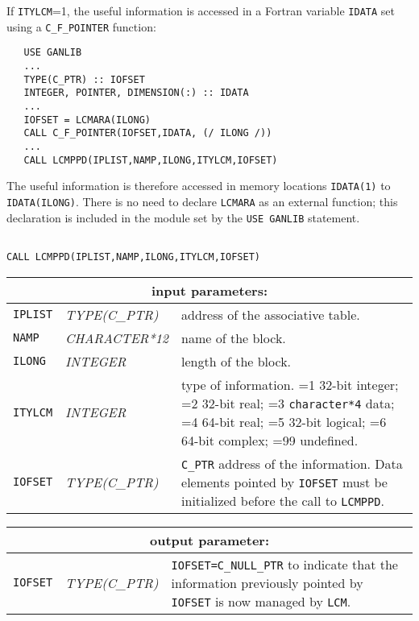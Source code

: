 \vskip 0.2cm

If {\tt ITYLCM}=1, the useful information is accessed in a Fortran variable {\tt IDATA} set using a {\tt C\_F\_POINTER} function:
\begin{verbatim}
   USE GANLIB
   ...
   TYPE(C_PTR) :: IOFSET
   INTEGER, POINTER, DIMENSION(:) :: IDATA
   ...
   IOFSET = LCMARA(ILONG)
   CALL C_F_POINTER(IOFSET,IDATA, (/ ILONG /))
   ...
   CALL LCMPPD(IPLIST,NAMP,ILONG,ITYLCM,IOFSET)
\end{verbatim}

The useful information is therefore accessed in memory locations {\tt IDATA(1)} to {\tt IDATA(ILONG)}. There is no need to 
declare {\tt LCMARA} as an external function; this declaration is included in the module set by the {\tt USE GANLIB} statement.

\begin{verbatim}

CALL LCMPPD(IPLIST,NAMP,ILONG,ITYLCM,IOFSET)
\end{verbatim}

\noindent
\begin{tabular}{|p{1.5cm}|p{3cm}|p{10cm}|}
\hline
\multicolumn{3}{|c|}{\bf input parameters:} \\
\hline
{\tt IPLIST} & {\it TYPE(C\_PTR)} & address of the associative table. \\
\hline
{\tt NAMP} & {\it CHARACTER*12} & name of the block. \\
\hline
{\tt ILONG} & {\it INTEGER} & length of the block. \\
\hline
{\tt ITYLCM} & {\it INTEGER} & type of information. =1 32-bit integer; 
                                    =2 32-bit real; =3 {\tt character*4} data; 
				    =4 64-bit real; =5 32-bit logical; =6 64-bit complex; =99 undefined.\\
\hline
{\tt IOFSET} &  {\it TYPE(C\_PTR)} & {\tt C\_PTR} address of the information. Data elements pointed
by {\tt IOFSET} must be initialized before the call to {\tt LCMPPD}. \\
\hline
\end{tabular}

\vskip 0.8cm

\noindent
\begin{tabular}{|p{1.5cm}|p{3cm}|p{10cm}|}
\hline
\multicolumn{3}{|c|}{\bf output parameter:} \\
\hline
{\tt IOFSET} & {\it TYPE(C\_PTR)}  & {\tt IOFSET=C\_NULL\_PTR} to indicate that the information previously pointed by
                                     {\tt IOFSET} is now managed by {\tt LCM}. \\
\hline
\end{tabular}

